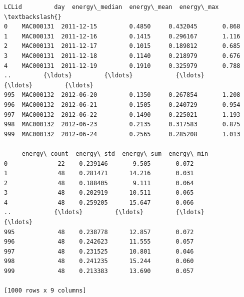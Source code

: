 \documentclass[11pt]{article}
\makeatletter
\newcommand{\boxspacing}{\kern\kvtcb@left@rule\kern\kvtcb@boxsep}
\newcommand{\prompt}[4]{
        {\ttfamily\llap{{\color{#2}[#3]:\hspace{3pt}#4}}\vspace{-\baselineskip}}
    }
\makeatother
\begin{document}
            \begin{tcolorbox}[breakable, size=fbox, boxrule=.5pt, pad at break*=1mm, opacityfill=0]
\prompt{Out}{outcolor}{24}{\boxspacing}
\begin{Verbatim}[commandchars=\\\{\}]
         LCLid         day  energy\_median  energy\_mean  energy\_max  \textbackslash{}
0    MAC000131  2011-12-15         0.4850     0.432045       0.868
1    MAC000131  2011-12-16         0.1415     0.296167       1.116
2    MAC000131  2011-12-17         0.1015     0.189812       0.685
3    MAC000131  2011-12-18         0.1140     0.218979       0.676
4    MAC000131  2011-12-19         0.1910     0.325979       0.788
..         {\ldots}         {\ldots}            {\ldots}          {\ldots}         {\ldots}
995  MAC000132  2012-06-20         0.1350     0.267854       1.208
996  MAC000132  2012-06-21         0.1505     0.240729       0.954
997  MAC000132  2012-06-22         0.1490     0.225021       1.193
998  MAC000132  2012-06-23         0.2135     0.317583       0.875
999  MAC000132  2012-06-24         0.2565     0.285208       1.013

     energy\_count  energy\_std  energy\_sum  energy\_min
0              22    0.239146       9.505       0.072
1              48    0.281471      14.216       0.031
2              48    0.188405       9.111       0.064
3              48    0.202919      10.511       0.065
4              48    0.259205      15.647       0.066
..            {\ldots}         {\ldots}         {\ldots}         {\ldots}
995            48    0.238778      12.857       0.072
996            48    0.242623      11.555       0.057
997            48    0.231525      10.801       0.046
998            48    0.241235      15.244       0.060
999            48    0.213383      13.690       0.057

[1000 rows x 9 columns]
\end{Verbatim}
\end{tcolorbox}
        
\end{document}
